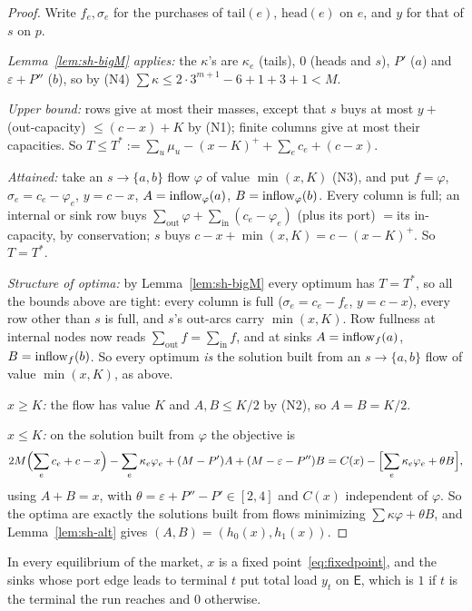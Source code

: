 \begin{proof}
\relax[$\Delta3$] Write $f_e,\sigma_e$ for the purchases of $\mathrm{tail}(e)$, $\mathrm{head}(e)$ on $e$, and
$y$ for that of $s$ on $p$.

\emph{Lemma~\ref{lem:sh-bigM} applies:} the $\kappa$'s are $\kappa_e$ (tails), $0$ (heads and $s$), $P'$
($a$) and $\varepsilon+P''$ ($b$), so by (N4) $\sum\kappa\le2\cdot3^{m+1}-6+1+3+1<M$.

\emph{Upper bound:} rows give at most their masses, except that $s$ buys at most $y+{}$(out-capacity)
${}\le(c-x)+K$ by (N1); finite columns give at most their capacities. So
$T\le T^*:=\sum_u\mu_u-(x-K)^++\sum_ec_e+(c-x)$.

\emph{Attained:} take an $s\to\{a,b\}$ flow $\varphi$ of value $\min(x,K)$ (N3), and put $f=\varphi$,
$\sigma_e=c_e-\varphi_e$, $y=c-x$, $A=\mathrm{inflow}_\varphi(a)$, $B=\mathrm{inflow}_\varphi(b)$. Every column is full;
an internal or sink row buys $\sum_{\mathrm{out}}\varphi+\sum_{\mathrm{in}}(c_e-\varphi_e)$ (plus its
port) ${}={}$its in-capacity, by conservation; $s$ buys $c-x+\min(x,K)=c-(x-K)^+$. So $T=T^*$.

\emph{Structure of optima:} by Lemma~\ref{lem:sh-bigM} every optimum has $T=T^*$, so all the bounds
above are tight: every column is full ($\sigma_e=c_e-f_e$, $y=c-x$), every row other than $s$ is full,
and $s$'s out-arcs carry $\min(x,K)$. Row fullness at internal nodes now reads
$\sum_{\mathrm{out}}f=\sum_{\mathrm{in}}f$, and at sinks $A=\mathrm{inflow}_f(a)$, $B=\mathrm{inflow}_f(b)$. So every
optimum \emph{is} the solution built from an $s\to\{a,b\}$ flow of value $\min(x,K)$, as above.

\emph{$x\ge K$:} the flow has value $K$ and $A,B\le K/2$ by (N2), so $A=B=K/2$.

\emph{$x\le K$:} on the solution built from $\varphi$ the objective is
\[
2M\Bigl(\sum_ec_e+c-x\Bigr)-\sum_e\kappa_e\varphi_e+(M-P')A+(M-\varepsilon-P'')B
=C(x)-\Bigl[\sum_e\kappa_e\varphi_e+\theta B\Bigr],
\]
using $A+B=x$, with $\theta=\varepsilon+P''-P'\in[2,4]$ and $C(x)$ independent of $\varphi$. So the optima
are exactly the solutions built from flows minimizing $\sum\kappa\varphi+\theta B$, and
Lemma~\ref{lem:sh-alt} gives $(A,B)=(h_0(x),h_1(x))$.
\end{proof}

\begin{theorem}[Composition]\label{thm:sh-compose}
\statuslean
In every equilibrium of the market, $x$ is a fixed point~\eqref{eq:fixedpoint}, and the sinks whose
port edge leads to terminal $t$ put total load $y_t$ on $\mathsf E$, which is $1$ if $t$ is the terminal
the run reaches and $0$ otherwise.
\end{theorem}


